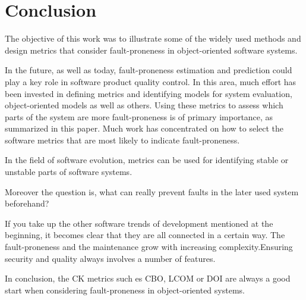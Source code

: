 \section{Conclusion}\label{conclusion}

The objective of this work was to illustrate some of the widely used methods and design metrics that consider fault-proneness in object-oriented software systems.

In the future, as well as today, fault-proneness estimation and prediction could play a key role in software product quality control.  In this area, much effort has been invested in defining metrics and identifying models for system evaluation, object-oriented models as well as others.  Using these metrics to assess which parts of the system are more fault-proneness is of primary importance, as summarized in this paper.
Much work has concentrated on how to select the software metrics that are most likely to indicate fault-proneness. 

In the field of software evolution, metrics can be used for identifying stable or unstable parts of software systems.

Moreover the question is, what can really prevent faults in the later used system beforehand?

If you take up the other software trends of development mentioned at the beginning, it becomes clear that they are all connected in a certain way. The fault-proneness and the maintenance grow with increasing complexity.Ensuring security and quality always involves a number of features.

In conclusion, the CK metrics such es CBO, LCOM or DOI are always a good start when considering fault-proneness in object-oriented systems. 







